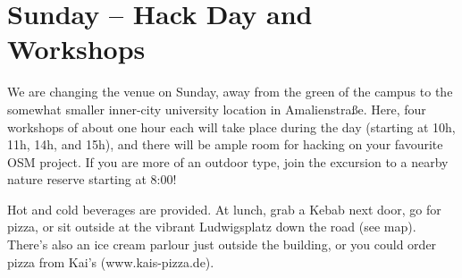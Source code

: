 \ClearWallPaper

\cropmarkswallpaper

\newpage
{}
\thispagestyle{empty}
\section*{Sunday -- Hack Day and Workshops}
\label{sunday}

We are changing the venue on Sunday, away from the green of
the campus to the somewhat smaller inner-city university
location in Amalienstraße. Here, 
four workshops of about
one hour each will take place during the day (starting at 10h,
11h, 14h, and 15h), and there will be ample room for
hacking on your favourite OSM project. If you are more of an
outdoor type, join the excursion to a nearby nature reserve
starting at 8:00!

Hot and cold beverages are provided. At lunch, 
grab a Kebab next door, go for pizza, or sit outside at
the vibrant Ludwigsplatz down the road (see map). There's also an ice cream parlour just outside the
building, or you could order pizza from Kai's (www.kais-pizza.de).
\cropmarkswallpaper
